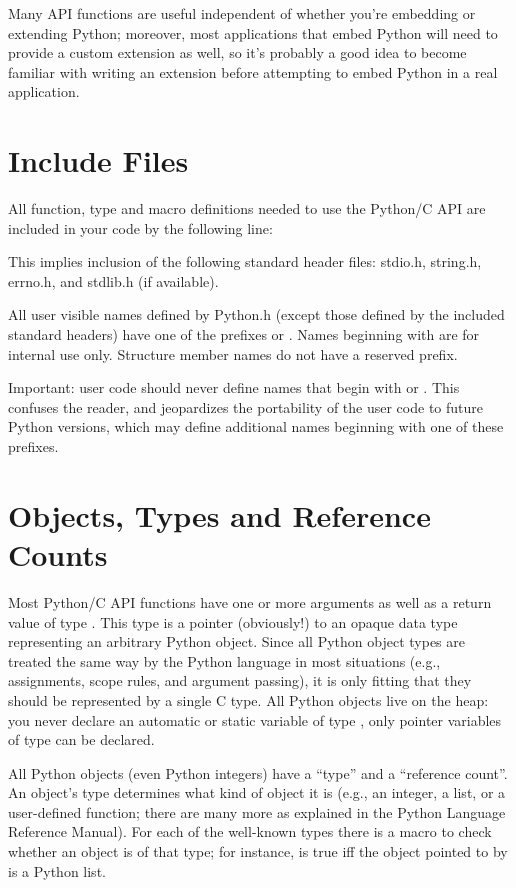 \documentclass[twoside]{report}
\begin{document}
Many API functions are useful independent of whether you're embedding 
or extending Python; moreover, most applications that embed Python 
will need to provide a custom extension as well, so it's probably a 
good idea to become familiar with writing an extension before 
attempting to embed Python in a real application.

\section{Include Files}

All function, type and macro definitions needed to use the Python/C
API are included in your code by the following line:


This implies inclusion of the following standard header files:
stdio.h, string.h, errno.h, and stdlib.h (if available).

All user visible names defined by Python.h (except those defined by
the included standard headers) have one of the prefixes  or
.  Names beginning with  are for internal use
only.  Structure member names do not have a reserved prefix.

Important: user code should never define names that begin with
 or .  This confuses the reader, and jeopardizes
the portability of the user code to future Python versions, which may
define additional names beginning with one of these prefixes.

\section{Objects, Types and Reference Counts}

Most Python/C API functions have one or more arguments as well as a
return value of type .  This type is a pointer
(obviously!)  to an opaque data type representing an arbitrary Python
object.  Since all Python object types are treated the same way by the
Python language in most situations (e.g., assignments, scope rules,
and argument passing), it is only fitting that they should be
represented by a single C type.  All Python objects live on the heap:
you never declare an automatic or static variable of type
, only pointer variables of type  can 
be declared.

All Python objects (even Python integers) have a ``type'' and a 
``reference count''.  An object's type determines what kind of object 
it is (e.g., an integer, a list, or a user-defined function; there are 
many more as explained in the Python Language Reference Manual).  For 
each of the well-known types there is a macro to check whether an 
object is of that type; for instance,  is true 
iff the object pointed to by  is a Python list.
\end{document}
